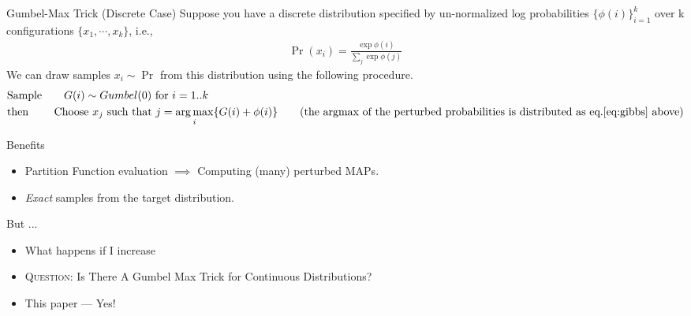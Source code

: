 \begin{frame}{Gumbel-Max Trick (Discrete Case)}
  Suppose you have a discrete distribution specified by un-normalized log probabilities $\{\phi(i)\}_{i=1}^{k}$ over k configurations $\{x_1,\cdots,x_k\}$, i.e.,
  \begin{align}
    \Pr(x_i) = \frac{\exp\phi(i)}{\sum_j\exp\phi(j)} \label{eq:gibbs}
  \end{align}
  We can draw samples $x_i \sim \Pr$ from this distribution using the following procedure.
  \begin{align*}
    & \text{Sample} \qquad G(i) \sim Gumbel(0) \text{ for } i=1..k\\
    & \text{then} \qquad \text{ Choose } x_j \text{ such that } j= \argmax_i \{G(i) +\phi(i)\} \tag{the argmax of the perturbed probabilities is distributed as eq.\ref{eq:gibbs} above}
  \end{align*}

\end{frame}

\begin{frame}{Benefits} %
  \begin{itemize}
  \item Partition Function evaluation $\implies$ Computing (many) perturbed MAPs. %
  \item \emph{Exact} samples from the target distribution. %
  \end{itemize}
  But ...
  \begin{itemize}
  \item What happens if I increase 
  \item \textsc{Question:} Is There A Gumbel Max Trick for Continuous Distributions? %
    \pause
  \item {\color{red} This paper --- Yes!}
  \end{itemize}
\end{frame}

  

